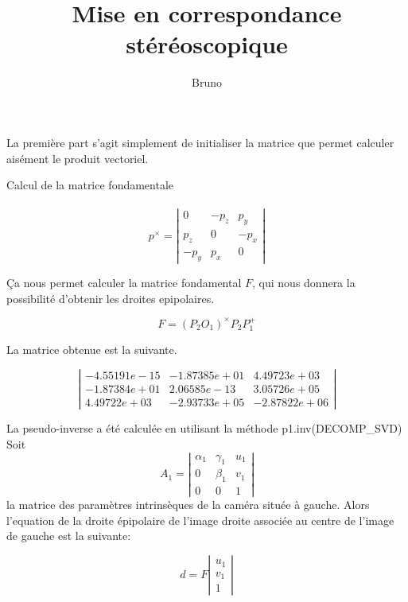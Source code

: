 \documentclass[a4paper,10pt]{article}
\title{Mise en correspondance stéréoscopique}
\author{Bruno \bsc{Ordozgoiti}}
\begin{document}
\maketitle

La première part s'agit simplement de initialiser la matrice que permet calculer aisément le produit vectoriel.


\begin{paragraph}{Calcul de la matrice fondamentale}~ \\
\\

$$
p^{\times} = 
\left| \begin{array}{ccc}
    0  & -p_{z}    &  p_{y} \\  
    p_{z}         &  0   &  -p_{x}   \\
    -p_{y}         &  p_{x}          &  0         
 
 \end{array}
\right|
$$

Ça nous permet calculer la matrice fondamental $F$, qui nous donnera la possibilité d'obtenir les droites epipolaires.

$$
F = (P_{2}O_{1})^{\times}P_{2}P_{1}^+
$$

La matrice obtenue est la suivante.

$$
\left| \begin{array}{ccc}
    -4.55191e-15  & -1.87385e+01    &  4.49723e+03 \\  
    -1.87384e+01         &  2.06585e-13   &  3.05726e+05   \\
    4.49722e+03         &  -2.93733e+05          &  -2.87822e+06         
 
 \end{array}
\right|
$$

La pseudo-inverse a été calculée en utilisant la méthode p1.inv(DECOMP\_SVD)
\\

Soit 
$$
A_1=
\left|
 \begin{array}{ccc}
    \alpha_{1} & \gamma_{1} &  	u_{1} \\
    0 & 	\beta_{1} &   	v_{1} \\
    0 & 	0 & 		1
 \end{array}
\right|
$$
la matrice des paramètres intrinsèques de la caméra située à gauche. 
Alors l'equation de la droite épipolaire de l'image droite associée au centre de l'image de gauche est la suivante:

$$
d=F 
\left|
\begin{array}{c}
    u_{1} \\
    v_{1} \\
    1
 \end{array}
\right|
$$


\end{paragraph}
\end{document}
